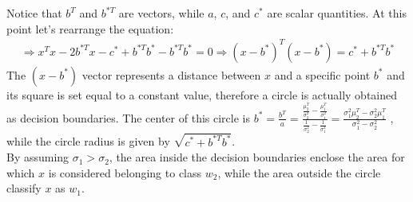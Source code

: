 Notice that \(b^T\) and \(b^{*T}\) are vectors, while \(a\), \(c\), and \(c^*\)
are scalar quantities. At this point let's rearrange the equation:
\begin{align*}
    \Rightarrow
    x^Tx-2b^{*T}x-c^*+b^{*T}b^*-b^{*T}b^*=0
    \Rightarrow
    (x-b^*)^T(x-b^*)=c^*+b^{*T}b^*
\end{align*}
The \((x-b^*)\) vector represents a distance between \(x\) and a specific point \(b^*\)
and its square is set equal to a constant value, therefore a circle is actually
obtained as decision boundaries. The center of this circle is
\(
    b^*=\frac{b^T}{a}
    =\frac{\frac{\mu_2^T}{\sigma_2^2}-\frac{\mu_1^T}{\sigma_1^2}}{\frac{1}{\sigma_2^2}-\frac{1}{\sigma_1^2}}
    =\frac{\sigma_1^2\mu_2^T-\sigma_2^2\mu_1^T}{\sigma_1^2-\sigma_2^2}
\)
, while
the circle radius is given by \(\sqrt{c^*+b^{*T}b^*}\).\\
By assuming \(\sigma_1>\sigma_2\), the area inside the decision boundaries enclose
the area for which \(x\) is considered belonging to class \(w_2\), while the area
outside the circle classify \(x\) as \(w_1\).